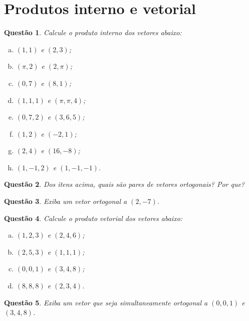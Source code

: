 \documentclass[a4paper,12pt]{article}
\newtheorem{qst}{Questão}[section]
\begin{document}
\section{Produtos interno e vetorial}
\begin{qst}
	Calcule o produto interno dos vetores abaixo:
	\begin{enumerate}[a)]
		\item $(1,1)$ e $(2,3)$;
		\item $(\pi, 2)$ e $(2, \pi)$;
		\item $(0,7)$ e $(8,1)$;
		\item $(1,1,1)$ e $(\pi,\pi, 4)$;
		\item $(0,7,2)$ e $(3,6,5)$;
		\item $(1,2)$ e $(-2, 1)$;
		\item $(2,4)$ e $(16, -8)$;
		\item $(1,-1, 2)$ e $(1,-1,-1)$.
	\end{enumerate}
\end{qst}
\begin{qst}
	Dos itens acima, quais são pares de vetores ortogonais? Por que?
\end{qst}

\begin{qst}
	Exiba um vetor ortogonal a $(2,-7)$.
\end{qst}
\begin{qst}
	Calcule o produto vetorial dos vetores abaixo:
	\begin{enumerate}[a)]
		\item $(1,2,3)$ e $(2,4,6)$;
		\item $(2,5,3)$ e $(1,1,1)$;
		\item $(0,0,1)$ e $(3,4,8)$;
		\item $(8,8,8)$ e $(2,3,4)$.
	\end{enumerate}
\end{qst}
\begin{qst}
	Exiba um vetor que seja simultaneamente ortogonal a $(0,0,1)$ e $(3,4,8)$.
\end{qst}
\pagebreak
\end{document}
